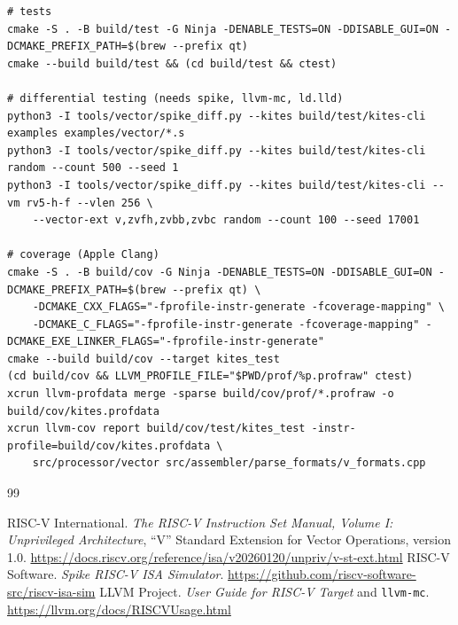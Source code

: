 \documentclass[11pt]{article}
\begin{document}
\begin{lstlisting}[language={},basicstyle=\ttfamily\scriptsize]
# tests
cmake -S . -B build/test -G Ninja -DENABLE_TESTS=ON -DDISABLE_GUI=ON -DCMAKE_PREFIX_PATH=$(brew --prefix qt)
cmake --build build/test && (cd build/test && ctest)

# differential testing (needs spike, llvm-mc, ld.lld)
python3 -I tools/vector/spike_diff.py --kites build/test/kites-cli examples examples/vector/*.s
python3 -I tools/vector/spike_diff.py --kites build/test/kites-cli random --count 500 --seed 1
python3 -I tools/vector/spike_diff.py --kites build/test/kites-cli --vm rv5-h-f --vlen 256 \
    --vector-ext v,zvfh,zvbb,zvbc random --count 100 --seed 17001

# coverage (Apple Clang)
cmake -S . -B build/cov -G Ninja -DENABLE_TESTS=ON -DDISABLE_GUI=ON -DCMAKE_PREFIX_PATH=$(brew --prefix qt) \
    -DCMAKE_CXX_FLAGS="-fprofile-instr-generate -fcoverage-mapping" \
    -DCMAKE_C_FLAGS="-fprofile-instr-generate -fcoverage-mapping" -DCMAKE_EXE_LINKER_FLAGS="-fprofile-instr-generate"
cmake --build build/cov --target kites_test
(cd build/cov && LLVM_PROFILE_FILE="$PWD/prof/%p.profraw" ctest)
xcrun llvm-profdata merge -sparse build/cov/prof/*.profraw -o build/cov/kites.profdata
xcrun llvm-cov report build/cov/test/kites_test -instr-profile=build/cov/kites.profdata \
    src/processor/vector src/assembler/parse_formats/v_formats.cpp
\end{lstlisting}

\begin{thebibliography}{99}\small\markboth{References}{References}
\bibitem{spec} RISC-V International. \emph{The RISC-V Instruction Set Manual, Volume I: Unprivileged
  Architecture}, ``V'' Standard Extension for Vector Operations, version 1.0.
  \url{https://docs.riscv.org/reference/isa/v20260120/unpriv/v-st-ext.html}
\bibitem{spike} RISC-V Software. \emph{Spike RISC-V ISA Simulator}.
  \url{https://github.com/riscv-software-src/riscv-isa-sim}
\bibitem{llvm} LLVM Project. \emph{User Guide for RISC-V Target} and \texttt{llvm-mc}.
  \url{https://llvm.org/docs/RISCVUsage.html}
\end{thebibliography}
\end{document}
